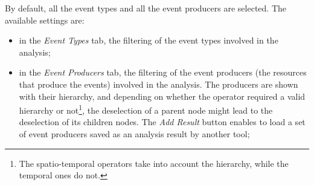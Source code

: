 \documentclass[twoside]{article}
\begin{document}
\begin{sloppypar}
By default, all the event types and all the event producers are selected. The available settings are:
\begin{itemize}
	\item in the \textit{Event Types} tab, the filtering of the event types involved in the analysis;
	\item in the \textit{Event Producers} tab, the filtering of the event producers (the resources that produce the events) involved in the analysis. The producers are shown with their hierarchy, and depending on whether the operator required a valid hierarchy or not\footnote{The spatio-temporal operators take into account the hierarchy, while the temporal ones do not.}, the deselection of a parent node might lead to the deselection of its children nodes. The \textit{Add Result} button enables to load a set of event producers saved as an analysis result by another tool;
   
\end{itemize}


\end{sloppypar}
\end{document}
